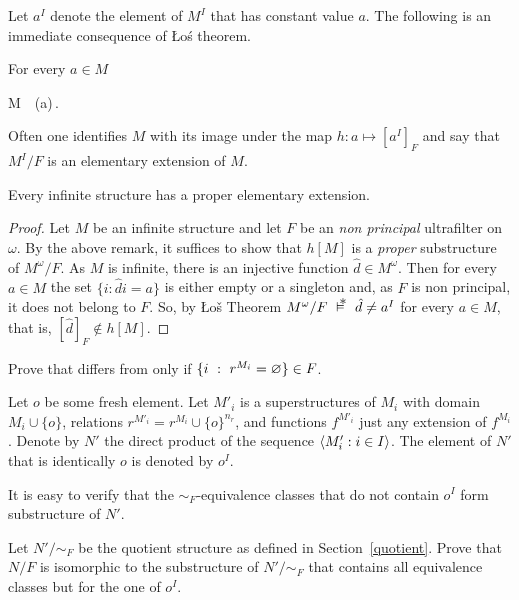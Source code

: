 \documentclass[creche.tex]{subfiles}
\begin{document}
Let \emph{$a^I$\/} denote the element of $M^I$ that has constant value $a$. The following is an immediate consequence of \L o\'{s} theorem.

\begin{corollary}\label{ultrapotenzeelementari}
For every $a\in M$

%
{\IFF}%
{M\ \models\ \phi(a)\,.}\QED
\end{corollary}


Often one identifies $M$ with its image under the map $h:a\mapsto [a^I]_F$ and say that $M^I/F$ is an elementary extension of $M$.

\begin{corollary}
Every infinite structure has a proper elementary extension.
\end{corollary}

\begin{proof}
Let $M$ be an infinite structure and let $F$ be an \textit{non principal\/} ultrafilter on $\omega$. By the above remark, it suffices to show that $h[M]$ is a \textit{proper\/} substructure of $M^\omega/F$.  As $M$ is infinite, there is an injective function  $\hat d\in M^\omega$. Then for every $a\in M$ the set $\big\{i:\hat di=a\big\}$ is either empty or a singleton and, as $F$ is non principal, it does not belong to $F$. So, by \L o\v{s} Theorem $M^\omega/F\ \pmodels\ \hat d\neq a^I$ for every $a\in M$, that is, $[\hat d]_F\notin h[M]$.
\end{proof}

\begin{exercise}\label{ex_c3=c3'}
Prove that  differs from  only if $\{ i\ :\ r^{M_i}=\varnothing\}\in F$. 
\end{exercise}




\begin{exercise}\label{ex_o}
Let \emph{$o$\/} be some fresh element. Let \emph{$M'_i$\/} is a superstructures of $M_i$ with domain $M_i\cup\{o\}$, relations $r^{M'_i}=r^{M_i}\cup\{o\}^{n_r}$, and functions $f^{M'_i}$ just any extension of $f^{M_i}$. Denote by $N'$ the direct product of the sequence $\langle M'_i:i\in I\rangle$. The element of $N'$ that is identically $o$ is denoted by $o^I$.
 
It is easy to verify that the $\mathord{\sim_F}$-equivalence classes that do not contain $o^I$ form substructure of $N'$.

Let $N'/\mathord{\sim_F}$ be the quotient structure as defined in Section~\ref{quotient}. Prove that $N/F$ is isomorphic to the substructure of $N'/\mathord{\sim_F}$ that contains all equivalence classes but for the one of $o^I$.\QED
\end{exercise}
\end{document}
